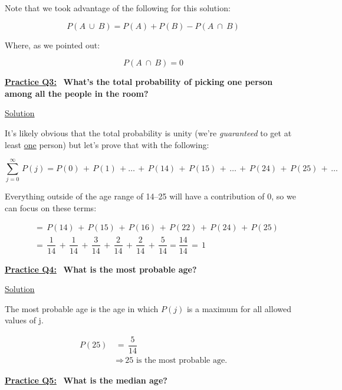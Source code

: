 Note that we took advantage of the following for this solution:

\[
    P(A \ \cup \ B) = P(A) + P(B) - P(A \ \cap \ B)
\]


Where, as we pointed out:

\[
    P(A \ \cap \ B) = 0
\]

\bigskip \bigskip

\underline{\textbf{Practice Q3:}} \ \textbf{What's the total probability of
picking one person among all the people in the room?}

\bigskip

\underline{Solution}

It's likely obvious that the total probability is unity (we're
\textit{guaranteed} to get at least \underline{one} person) but let's prove
that with the following:

\[
    \sum_{j=0}^{\infty} \, P(j) = P(0) \, + \, P(1) \, + \dots \, + \, P(14) \,
    + \, P(15) \, + \, \dots \, + \, P(24) \, + \, P(25) \, + \, \dots
\]

Everything outside of the age range of 14--25 will have a contribution of 0,
so we can focus on these terms:

\begin{align*}
    &= \, P(14) \, + \, P(15) \, + \, P(16) \, + \, P(22) \, + \, P(24) \, + \,
    P(25) \\[1.5ex]
    &= \, \dfrac{1}{14} \, + \, \dfrac{1}{14} \, + \, \dfrac{3}{14} \, + \,
    \dfrac{2}{14} \, + \, \dfrac{2}{14} \, + \, \dfrac{5}{14} = \dfrac{14}{14}
    \, = \, \boxed{1}
\end{align*}

\newpage

\underline{\textbf{Practice Q4:}} \ \textbf{What is the most probable age?}

\bigskip

\underline{Solution}

The most probable age is the age in which $P(j)$ is a maximum for all allowed
values of j.

\begin{align*}
    P(25) \, &= \, \dfrac{5}{14} \\[1.5ex]
    &\Rightarrow \, \boxed{\text{25 is the most probable age.}}
\end{align*}

\bigskip \bigskip

\underline{\textbf{Practice Q5:}} \ \textbf{What is the median age?}

\bigskip

